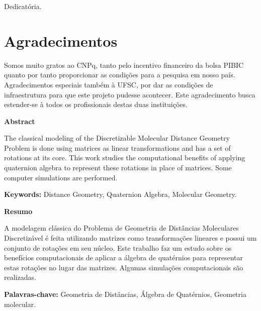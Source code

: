 \documentclass[a4paper,12pt]{report}
\theoremstyle{plain}
\theoremstyle{definition}
\begin{document}
	\newpage
	\vspace*{\fill}
	\begin{flushright}
		Dedicatória.
	\end{flushright}
	
	\newpage
	
	\chapter*{Agradecimentos}
	
	Somos muito gratos ao CNPq, tanto pelo incentivo financeiro da bolsa PIBIC quanto por tanto proporcionar as condições para a pesquisa em nosso país. Agradecimentos especiais também à UFSC, por dar as condições de infraestrutura para que este projeto pudesse acontecer. Este agradecimento busca estender-se à todos os profissionais destas duas instituições.
	
	\newpage
	\tableofcontents
	\newpage
	
	\begin{center}
		\large
		\textbf{Abstract}
	\end{center}
	
	The classical modeling of the Discretizable Molecular Distance Geometry Problem is done using matrices as linear transformations and has a set of rotations at its core. This work studies the computational benefits of applying quaternion algebra to represent these rotations in place of matrices. Some computer simulations are performed. 
	
	\textbf{Keywords:} Distance Geometry, Quaternion Algebra, Molecular Geometry.
	
	
	\vspace{2cm}	
	\begin{center}
		\large
		\textbf{Resumo}
	\end{center}
	
	A modelagem clássica do Problema de Geometria de Distâncias Moleculares Discretizável é feita utilizando matrizes como transformações lineares e possui um conjunto de rotações em seu núcleo. Este trabalho faz um estudo sobre os benefícios computacionais de aplicar a álgebra de quatérnios para representar estas rotações no lugar das matrizes. Algumas simulações computacionais são realizadas.
	
	\textbf{Palavras-chave:} Geometria de Distâncias, Álgebra de Quatérnios, Geometria molecular.
	
	
	\newpage
\end{document}
